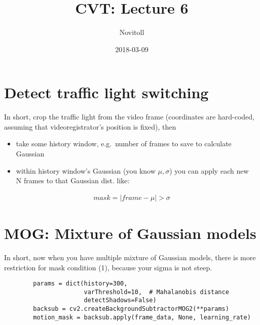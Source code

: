\documentclass[11pt]{article}
\title{CVT: Lecture 6}
\date{2018-03-09}
\author{Novitoll}
\begin{document}
    \maketitle

    \section{Detect traffic light switching} \label{sec:practice-traffic-light}

    In short, crop the traffic light from the video frame (coordinates are hard-coded,
    assuming that videoregistrator's position is fixed), then

    \begin{itemize}
        \item take some history window, e.g.\ number of frames to save to calculate Gaussian
        \item within history window's Gaussian (you know $\mu, \sigma$) you can apply each new \\
              N frames to that Gaussian dist. like:
    \end{itemize}

    \begin{align}
        mask = \lvert frame - \mu \rvert > \sigma
    \end{align}

    \section{MOG: Mixture of Gaussian models} \label{sec:mog}

    In short, now when you have multiple mixture of Gaussian models,
    there is more restriction for mask condition (1), because your sigma is not steep.

    \begin{lstlisting}
        params = dict(history=300,
                      varThreshold=10,  # Mahalanobis distance
                      detectShadows=False)
        backsub = cv2.createBackgroundSubtractorMOG2(**params)
        motion_mask = backsub.apply(frame_data, None, learning_rate)
    \end{lstlisting}
\end{document}
